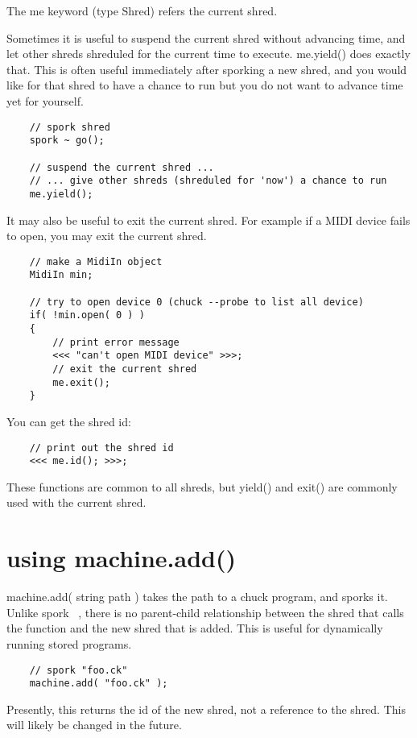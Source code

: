 The me keyword (type Shred) refers the current shred.

Sometimes it is useful to suspend the current shred without advancing time, and let other shreds shreduled for the current time to execute.  me.yield() does exactly that. This is often useful immediately after sporking a new shred, and you would like for that shred to have a chance to run but you do not want to advance time yet for yourself.
\begin{verbatim}
    // spork shred
    spork ~ go();

    // suspend the current shred ...
    // ... give other shreds (shreduled for 'now') a chance to run
    me.yield();
\end{verbatim}

It may also be useful to exit the current shred. For example if a MIDI device fails to open, you may exit the current shred.
\begin{verbatim}
    // make a MidiIn object
    MidiIn min;

    // try to open device 0 (chuck --probe to list all device)
    if( !min.open( 0 ) )
    {
        // print error message
        <<< "can't open MIDI device" >>>;
        // exit the current shred
        me.exit();
    }
\end{verbatim}

You can get the shred id:
\begin{verbatim}
    // print out the shred id
    <<< me.id(); >>>;
\end{verbatim}

These functions are common to all shreds, but yield() and exit() are commonly used with the current shred.
 
\section{using machine.add()}

machine.add( string path ) takes the path to a chuck program, and sporks it. Unlike spork ~, there is no parent-child relationship between the shred that calls the function and the new shred that is added. This is useful for dynamically running stored programs.
\begin{verbatim}
    // spork "foo.ck"
    machine.add( "foo.ck" );
\end{verbatim}

Presently, this returns the id of the new shred, not a reference to the shred. This will likely be changed in the future.

